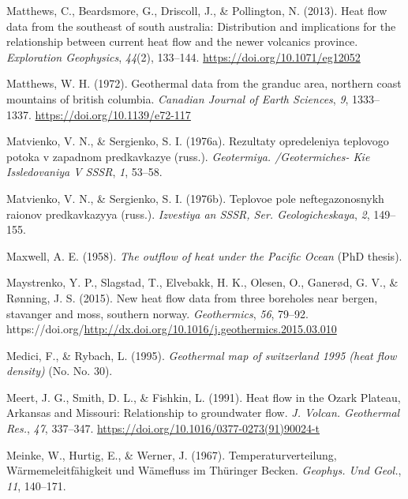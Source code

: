 \begin{CSLReferences}{1}{1}
\leavevmode{}%
Matthews, C., Beardsmore, G., Driscoll, J., \& Pollington, N. (2013). Heat flow data from the southeast of south australia: Distribution and implications for the relationship between current heat flow and the newer volcanics province. \emph{Exploration Geophysics}, \emph{44}(2), 133--144. \url{https://doi.org/10.1071/eg12052}

\leavevmode{}%
Matthews, W. H. (1972). Geothermal data from the granduc area, northern coast mountains of british columbia. \emph{Canadian Journal of Earth Sciences}, \emph{9}, 1333--1337. \url{https://doi.org/10.1139/e72-117}

\leavevmode{}%
Matvienko, V. N., \& Sergienko, S. I. (1976a). Rezultaty opredeleniya teplovogo potoka v zapadnom predkavkazye (russ.). \emph{Geotermiya. /Geotermiches- Kie Issledovaniya V SSSR}, \emph{1}, 53--58.

\leavevmode{}%
Matvienko, V. N., \& Sergienko, S. I. (1976b). Teplovoe pole neftegazonosnykh raionov predkavkazyya (russ.). \emph{Izvestiya an SSSR, Ser. Geologicheskaya}, \emph{2}, 149--155.

\leavevmode{}%
Maxwell, A. E. (1958). \emph{The outflow of heat under the {Pacific Ocean}} (PhD thesis).

\leavevmode{}%
Maystrenko, Y. P., Slagstad, T., Elvebakk, H. K., Olesen, O., Ganerød, G. V., \& Rønning, J. S. (2015). New heat flow data from three boreholes near bergen, stavanger and moss, southern norway. \emph{Geothermics}, \emph{56}, 79--92. https://doi.org/\url{http://dx.doi.org/10.1016/j.geothermics.2015.03.010}

\leavevmode{}%
Medici, F., \& Rybach, L. (1995). \emph{Geothermal map of switzerland 1995 (heat flow density)} (No. No. 30).

\leavevmode{}%
Meert, J. G., Smith, D. L., \& Fishkin, L. (1991). Heat flow in the {Ozark Plateau, Arkansas and Missouri}: Relationship to groundwater flow. \emph{J. Volcan. Geothermal Res.}, \emph{47}, 337--347. \url{https://doi.org/10.1016/0377-0273(91)90024-t}

\leavevmode{}%
Meinke, W., Hurtig, E., \& Werner, J. (1967). Temperaturverteilung, {Wärmemeleitfähigkeit und Wämefluss im Thüringer Becken}. \emph{Geophys. Und Geol.}, \emph{11}, 140--171.


\end{CSLReferences}
